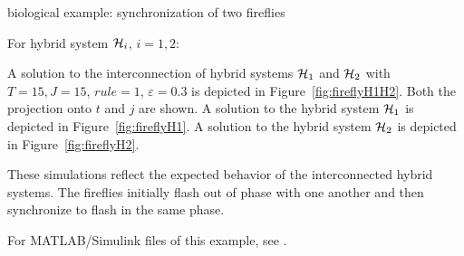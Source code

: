 \begin{example}{biological example: synchronization of two fireflies}

For hybrid system $\mathcal{H}_i$, $i = 1,2$:





A solution to the interconnection of hybrid systems $\mathcal{H}_1$ and
$\mathcal{H}_2$ with $T=15, J=15$, $rule =1$, $\varepsilon=0.3$ is depicted in Figure~\ref{fig:fireflyH1H2}. Both the projection onto $t$ and $j$ are shown. A solution to the hybrid system $\mathcal{H}_1$ is depicted in Figure~\ref{fig:fireflyH1}. A solution to the hybrid system $\mathcal{H}_2$ is depicted in Figure~\ref{fig:fireflyH2}.

These simulations reflect the expected behavior of the interconnected hybrid systems. The fireflies initially flash out of phase with one another and then synchronize to flash in the same phase.

For MATLAB/Simulink files of this example, see .

\end{example}



